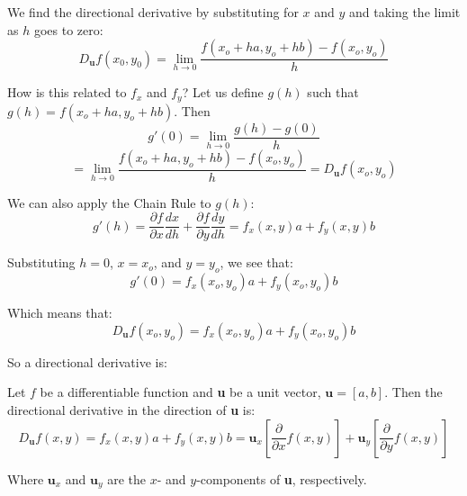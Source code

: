 We find the directional derivative by substituting for $x$ and $y$ and taking 
the limit as $h$ goes to zero:
$$D_{\textbf{u}} f(x_0, y_0) = \lim_{h \to 0} \frac{f(x_o + ha, y_o + hb) - 
f(x_o, y_o)}{h}$$

How is this related to $f_x$ and $f_y$? Let us define $g(h)$ such that $g(h) = 
f(x_o + ha, y_o + hb)$. Then
$$g'(0) = \lim_{h \to 0} \frac{g(h) - g(0)}{h}$$
$$= \lim_{h \to 0} \frac{f(x_o + ha, y_o + hb) - f(x_o, y_o)}{h} = 
D_{\textbf{u}} f(x_o, y_o)$$

We can also apply the Chain Rule to $g(h)$:
$$g'(h) = \frac{\partial f}{\partial x} \frac{dx}{dh} + \frac{\partial f}{
\partial y} \frac{dy}{dh} = f_x(x, y)a + f_y(x, y)b$$

Substituting $h = 0$, $x = x_o$, and $y = y_o$, we see that:
$$g'(0) = f_x(x_o, y_o)a + f_y(x_o, y_o)b$$

Which means that:
$$D_{\textbf{u}} f(x_o, y_o) = f_x(x_o, y_o)a + f_y(x_o, y_o)b$$

So a directional derivative is:

\begin{mdframed}[style = important, frametitle = {The Directional Derivative}]
Let $f$ be a differentiable function and \textbf{u} be a unit vector, 
$\textbf{u} = \left[ a, b \right]$. Then the directional derivative in the 
direction of \textbf{u} is:
\begin{equation}
    D_{\textbf{u}} f(x, y) = f_x(x, y)a + f_y(x, y)b = \textbf{u}_x \left[ 
    \frac{\partial}{\partial x} f(x, y) \right] + \textbf{u}_y \left[ \frac{
    \partial}{\partial y} f(x, y) \right]
    \label{eq:directionalDeriv}
\end{equation}

Where $\textbf{u}_x$ and $\textbf{u}_y$ are the $x$- and $y$-components of 
\textbf{u}, respectively. 
\end{mdframed}


